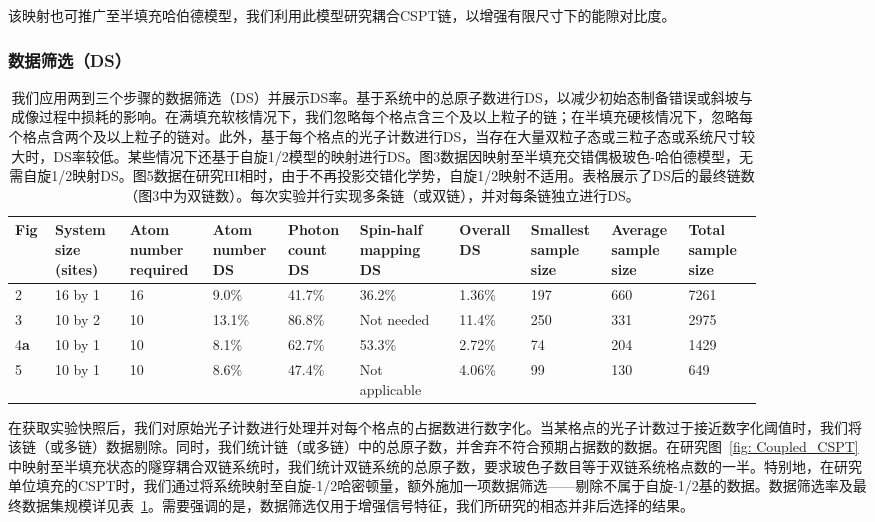 \documentclass[preprint,superscriptaddress,floatfix, nofootinbib]{revtex4-2}
\begin{document}
\begin{CJK*}{UTF8}{gbsn}
该映射也可推广至半填充哈伯德模型，我们利用此模型研究耦合CSPT链，以增强有限尺寸下的能隙对比度。
\subsubsection*{数据筛选（DS）}

\begin{table}[ht]
\begin{ruledtabular}
\begin{tabular}{p{0.04\linewidth} | p{0.09\linewidth} | p{0.1\linewidth} | p{0.09\linewidth} | p{0.08\linewidth} | p{0.12\linewidth} | p{0.08\linewidth} | p{0.09\linewidth} | p{0.09\linewidth} | p{0.09\linewidth}}
    Fig & System size (sites) & Atom number required & Atom number DS & Photon count DS & Spin-half mapping DS & Overall DS & Smallest sample size & Average sample size & Total sample size \\
    \hline
    2 & 16 by 1 & 16 & 9.0\% & 41.7\% & 36.2\% & 1.36\% & 197 & 660 & 7261 \\
    3 & 10 by 2 & 10 & 13.1\% & 86.8\% & Not needed & 11.4\% & 250 & 331 & 2975 \\
    4\textbf{a} & 10 by 1 & 10 & 8.1\% & 62.7\% & 53.3\% & 2.72\% & 74 & 204 & 1429 \\
    5 & 10 by 1 & 10 & 8.6\% & 47.4\% & Not applicable & 4.06\% & 99 & 130 & 649
\end{tabular}
\end{ruledtabular}
\caption{\label{tab:data_size} 我们应用两到三个步骤的数据筛选（DS）并展示DS率。基于系统中的总原子数进行DS，以减少初始态制备错误或斜坡与成像过程中损耗的影响。在满填充软核情况下，我们忽略每个格点含三个及以上粒子的链；在半填充硬核情况下，忽略每个格点含两个及以上粒子的链对。此外，基于每个格点的光子计数进行DS，当存在大量双粒子态或三粒子态或系统尺寸较大时，DS率较低。某些情况下还基于自旋1/2模型的映射进行DS。图3数据因映射至半填充交错偶极玻色-哈伯德模型，无需自旋1/2映射DS。图5数据在研究HI相时，由于不再投影交错化学势，自旋1/2映射不适用。表格展示了DS后的最终链数（图3中为双链数）。每次实验并行实现多条链（或双链），并对每条链独立进行DS。}
\end{table}

在获取实验快照后，我们对原始光子计数进行处理并对每个格点的占据数进行数字化。当某格点的光子计数过于接近数字化阈值时，我们将该链（或多链）数据剔除。同时，我们统计链（或多链）中的总原子数，并舍弃不符合预期占据数的数据。在研究图~\ref{fig: Coupled_CSPT}中映射至半填充状态的隧穿耦合双链系统时，我们统计双链系统的总原子数，要求玻色子数目等于双链系统格点数的一半。特别地，在研究单位填充的CSPT时，我们通过将系统映射至自旋-1/2哈密顿量，额外施加一项数据筛选——剔除不属于自旋-1/2基的数据。数据筛选率及最终数据集规模详见表~\ref{tab:data_size}。需要强调的是，数据筛选仅用于增强信号特征，我们所研究的相态并非后选择的结果。

\end{CJK*}
\end{document}
